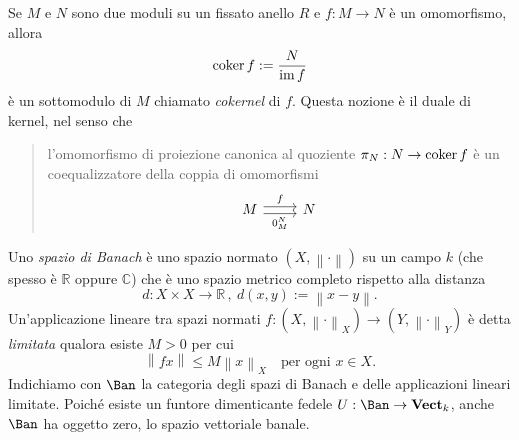 \begin{example}\label{example:CokernelInModR}
  Se \(M\) e \(N\) sono due moduli su un fissato anello \(R\) e
  \(f : M \to N\) è un omomorfismo, allora
  \[
    \operatorname{coker} f := \frac{N}{\operatorname{im} f}
  \]
  è un sottomodulo di \(M\) chiamato {\em cokernel} di \(f\). Questa
  nozione è il duale di kernel, nel senso che
  \begin{quotation}
    l'omomorfismo di proiezione canonica al quoziente
    \(\pi_N : N \to \operatorname{coker} f\) è un coequalizzatore della coppia di
    omomorfismi
    \[
      \begin{tikzcd}
        M \ar["f", shift left, r] \ar["{0_M^N}", shift right, swap, r]
        & N
      \end{tikzcd}
    \]
  \end{quotation}
\end{example}

\begin{recall}
  Uno {\em spazio di Banach} è uno spazio normato
  \((X, \left\lVert \cdot \right\rVert)\) su un campo \(k\) (che spesso è
  \(\mathbb{R}\) oppure \(\mathbb{C}\)) che è uno spazio metrico completo
  rispetto alla distanza
  \[
    d : X \times X \to \mathbb{R} \,, \ d(x, y) := \left\lVert x-y \right\rVert .
  \]
  Un'applicazione lineare tra spazi normati
  \(f : (X, \left\lVert \cdot \right\rVert_X) \to (Y, \left\lVert \cdot
  \right\rVert_Y)\) è detta {\em limitata} qualora esiste \(M > 0\) per
  cui
  \[
    \left\lVert f x \right\rVert \le M \left\lVert x \right\rVert_X
    \quad\text{per ogni } x \in X .
  \]
  Indichiamo con \(\Ban\) la categoria degli spazi di Banach e delle
  applicazioni lineari limitate. Poiché esiste un funtore dimenticante
  fedele \(U : \Ban \to \Vect_k\), anche \(\Ban\) ha oggetto zero, lo
  spazio vettoriale banale.
\end{recall}

